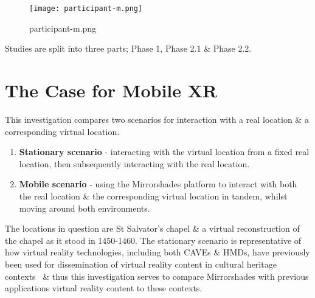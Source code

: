 
\begin{figure}[h]
	\begin{center}
		\texttt{[image: participant-m.png]}
		\caption{participant-m.png}
		\label{participant-m.png}
	\end{center}
\end{figure}

Studies are split into three parts; Phase 1, Phase 2.1 \& Phase 2.2.

\section{The Case for Mobile XR}
This investigation compares two scenarios for interaction with a real location \& a corresponding virtual location.

\begin{enumerate}
	\item \textbf{Stationary scenario} - interacting with the virtual location from a fixed real location, then subsequently interacting with the real location.
	\item \textbf{Mobile scenario} - using the Mirrorshades platform to interact with both the real location \& the corresponding virtual location in tandem, whilst moving around both environments.
\end{enumerate}

The locations in question are St Salvator's chapel \& a virtual reconstruction of the chapel as it stood in 1450-1460. The stationary scenario is representative of how virtual reality technologies, including both CAVEs \& HMDs, have previously been used for dissemination of virtual reality content in cultural heritage contexts~\cite{Roussou2002} \& thus this investigation serves to compare Mirrorshades with previous applications virtual reality content to these contexts.

